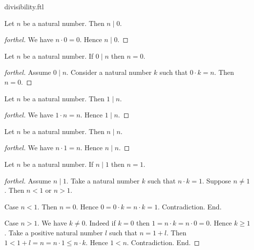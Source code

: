 \documentclass{naproche-library}
\begin{document}
\begin{smodule}{divisibility.ftl}
  \begin{proposition}[forthel,id=ARITHMETIC_07_2242720387039232,printid]
    Let $n$ be a natural number.
    Then $n \mid 0$.
  \end{proposition}
  \begin{proof}[forthel]
    We have $n \cdot 0 = 0$.
    Hence $n \mid 0$.
  \end{proof}

  \begin{proposition}[forthel,id=ARITHMETIC_07_8611150130315264,printid]
    Let $n$ be a natural number.
    If $0 \mid n$ then $n = 0$.
  \end{proposition}
  \begin{proof}[forthel]
    Assume $0 \mid n$.
    Consider a natural number $k$ such that $0 \cdot k = n$.
    Then $n = 0$.
  \end{proof}

  \begin{proposition}[forthel,id=ARITHMETIC_07_1259086070939648,printid]
    Let $n$ be a natural number.
    Then $1 \mid n$.
  \end{proposition}
  \begin{proof}[forthel]
    We have $1 \cdot n = n$.
    Hence $1 \mid n$.
  \end{proof}

  \begin{proposition}[forthel,id=ARITHMETIC_07_3944887330275328,printid]
    Let $n$ be a natural number.
    Then $n \mid n$.
  \end{proposition}
  \begin{proof}[forthel]
    We have $n \cdot 1 = n$.
    Hence $n \mid n$.
  \end{proof}

  \begin{proposition}[forthel,id=ARITHMETIC_07_6917446193643520,printid]
    Let $n$ be a natural number.
    If $n \mid 1$ then $n = 1$.
  \end{proposition}
  \begin{proof}[forthel]
    Assume $n \mid 1$.
    Take a natural number $k$ such that $n \cdot k = 1$.
    Suppose $n \neq 1$.
    Then $n < 1$ or $n > 1$.

    Case $n < 1$.
      Then $n = 0$.
      Hence $0
        = 0 \cdot k
        = n \cdot k
        = 1$.
      Contradiction.
    End.

    Case $n > 1$.
      We have $k \neq 0$.
      Indeed if $k = 0$ then
      $1
        = n \cdot k
        = n \cdot 0
        = 0$.
      Hence $k \geq 1$.
      Take a positive natural number $l$ such that $n = 1 + l$.
      Then $1
        < 1 + l
        = n
        = n \cdot 1
        \leq n \cdot k$.
      Hence $1 < n$.
      Contradiction.
    End.
  \end{proof}


\end{smodule}
\end{document}
